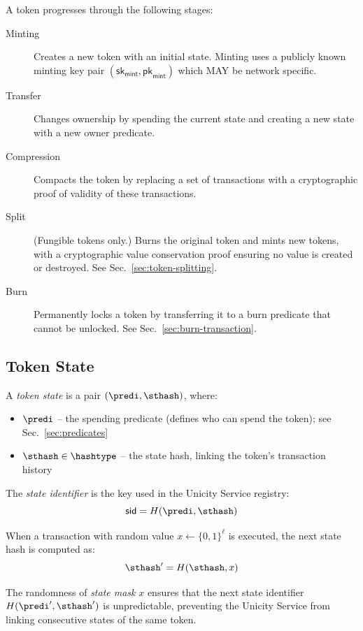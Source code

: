 A token progresses through the following stages:
\begin{description}
\item[Minting] Creates a new token with an initial state. Minting uses a publicly known minting key pair $(\mathsf{sk}_\mathsf{mint}, \mathsf{pk}_\mathsf{mint})$ which MAY be network specific.
\item[Transfer] Changes ownership by spending the current state and creating a new state with a new owner predicate.
\item[Compression] Compacts the token by replacing a set of transactions with a cryptographic proof of validity of these transactions.
\item[Split] (Fungible tokens only.) Burns the original token and mints new tokens, with a cryptographic value conservation proof ensuring no value is created or destroyed. See Sec.~\ref{sec:token-splitting}.
\item[Burn] Permanently locks a token by transferring it to a burn predicate that cannot be unlocked. See Sec.~\ref{sec:burn-transaction}.
\end{description}

\subsection{Token State}\label{sec:token-state}

A \emph{token state} is a pair $(\predi, \sthash)$, where:
\begin{itemize}
	\item $\predi$ -- the spending predicate (defines who can spend the token); see Sec.~\ref{sec:predicates}
	\item $\sthash \in \hashtype$ -- the state hash, linking the token's transaction history
\end{itemize}

The \emph{state identifier} is the key used in the Unicity Service registry:
\[
\mathsf{sid} = H(\predi, \sthash)
\]

When a transaction with random value $x \gets \{0,1\}^\ell$ is executed, the next state hash is computed as:
\[
\sthash' = H(\sthash, x)
\]

The randomness of \emph{state mask} $x$ ensures that the next state identifier $H(\predi', \sthash')$ is unpredictable, preventing the Unicity Service from linking consecutive states of the same token.

